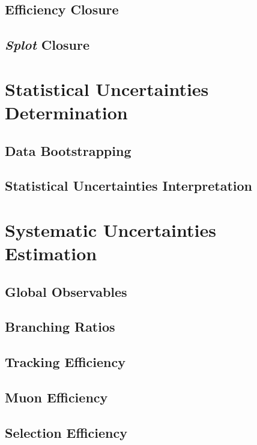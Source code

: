 \subsection{Efficiency Closure}

\subsection{\textit{Splot} Closure}


\section{Statistical Uncertainties Determination} 

\subsection{Data Bootstrapping}

\subsection{Statistical Uncertainties Interpretation}

\section{Systematic Uncertainties Estimation} 

\subsection{Global Observables}

\subsection{Branching Ratios}

\subsection{Tracking Efficiency}

\subsection{Muon Efficiency}

\subsection{Selection Efficiency}

